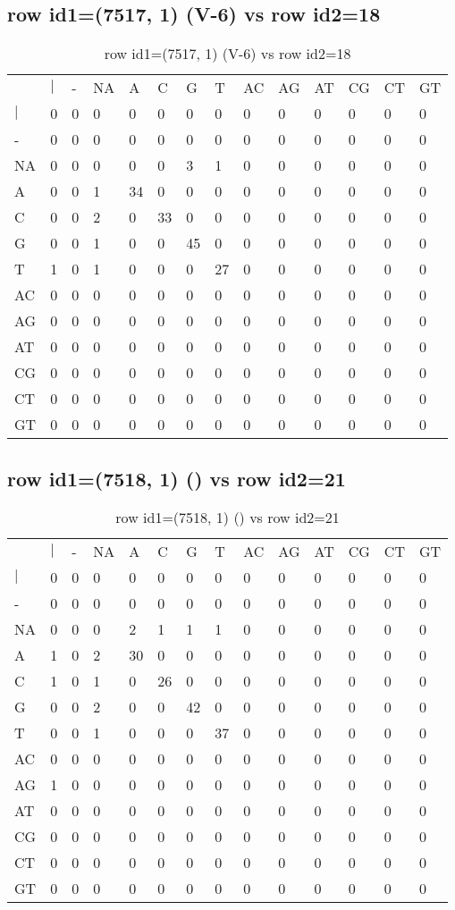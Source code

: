 \subsection{row id1=(7517, 1) (V-6) vs row id2=18}
\begin{center}
\begin{longtable}{|l|l|l|l|l|l|l|l|l|l|l|l|l|l|}
\caption{row id1=(7517, 1) (V-6) vs row id2=18} \label{table_dm322}\\
\hline
\\
\hline
&$|$&-&NA&A&C&G&T&AC&AG&AT&CG&CT&GT\\
$|$&0&0&0&0&0&0&0&0&0&0&0&0&0\\
-&0&0&0&0&0&0&0&0&0&0&0&0&0\\
NA&0&0&0&0&0&3&1&0&0&0&0&0&0\\
A&0&0&1&34&0&0&0&0&0&0&0&0&0\\
C&0&0&2&0&33&0&0&0&0&0&0&0&0\\
G&0&0&1&0&0&45&0&0&0&0&0&0&0\\
T&1&0&1&0&0&0&27&0&0&0&0&0&0\\
AC&0&0&0&0&0&0&0&0&0&0&0&0&0\\
AG&0&0&0&0&0&0&0&0&0&0&0&0&0\\
AT&0&0&0&0&0&0&0&0&0&0&0&0&0\\
CG&0&0&0&0&0&0&0&0&0&0&0&0&0\\
CT&0&0&0&0&0&0&0&0&0&0&0&0&0\\
GT&0&0&0&0&0&0&0&0&0&0&0&0&0\\
\hline
\end{longtable}
\end{center}

\subsection{row id1=(7518, 1) () vs row id2=21}
\begin{center}
\begin{longtable}{|l|l|l|l|l|l|l|l|l|l|l|l|l|l|}
\caption{row id1=(7518, 1) () vs row id2=21} \label{table_dm324}\\
\hline
\\
\hline
&$|$&-&NA&A&C&G&T&AC&AG&AT&CG&CT&GT\\
$|$&0&0&0&0&0&0&0&0&0&0&0&0&0\\
-&0&0&0&0&0&0&0&0&0&0&0&0&0\\
NA&0&0&0&2&1&1&1&0&0&0&0&0&0\\
A&1&0&2&30&0&0&0&0&0&0&0&0&0\\
C&1&0&1&0&26&0&0&0&0&0&0&0&0\\
G&0&0&2&0&0&42&0&0&0&0&0&0&0\\
T&0&0&1&0&0&0&37&0&0&0&0&0&0\\
AC&0&0&0&0&0&0&0&0&0&0&0&0&0\\
AG&1&0&0&0&0&0&0&0&0&0&0&0&0\\
AT&0&0&0&0&0&0&0&0&0&0&0&0&0\\
CG&0&0&0&0&0&0&0&0&0&0&0&0&0\\
CT&0&0&0&0&0&0&0&0&0&0&0&0&0\\
GT&0&0&0&0&0&0&0&0&0&0&0&0&0\\
\hline
\end{longtable}
\end{center}

